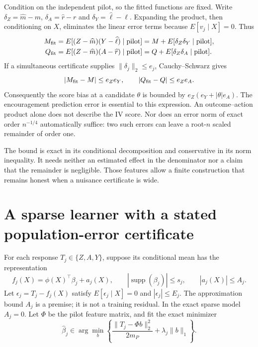 Condition on the independent pilot, so the fitted functions are fixed. Write
$\delta_Z=\widehat m-m$, $\delta_A=\widehat r-r$ and
$\delta_Y=\widehat\ell-\ell$. Expanding the product, then conditioning on $X$,
eliminates the linear error terms because $E[v_j\mid X]=0$. Thus
\begin{align}
 M_{\rm fit}&=E[(Z-\widehat m)(Y-\widehat\ell)\mid\text{pilot}]
             =M+E[\delta_Z\delta_Y\mid\text{pilot}],\\
 Q_{\rm fit}&=E[(Z-\widehat m)(A-\widehat r)\mid\text{pilot}]
             =Q+E[\delta_Z\delta_A\mid\text{pilot}].
 \label{exec13:pilot-bias}
\end{align}
If a simultaneous certificate supplies $\|\delta_j\|_2\le e_j$, Cauchy--Schwarz
gives
\begin{equation}
 |M_{\rm fit}-M|\le e_Ze_Y,\qquad
 |Q_{\rm fit}-Q|\le e_Ze_A.
 \label{exec13:pilot-products}
\end{equation}
Consequently the score bias at a candidate $\theta$ is bounded by
$e_Z(e_Y+|\theta|e_A)$. The encouragement prediction error is essential to
this expression. An outcome--action product alone does not describe the IV
score. Nor does an error norm of exact order $n^{-1/4}$ automatically suffice:
two such errors can leave a root-$n$ scaled remainder of order one.

The bound is exact in its conditional decomposition and conservative in its
norm inequality. It needs neither an estimated effect in the denominator nor
a claim that the remainder is negligible. Those features allow a finite
construction that remains honest when a nuisance certificate is wide.

\section{A sparse learner with a stated population-error certificate}

For each response $T_j\in\{Z,A,Y\}$, suppose its conditional mean has the
representation
\begin{equation}
 f_j(X)=\phi(X)^\top\beta_j+a_j(X),\qquad
 |\operatorname{supp}(\beta_j)|\le s_j,\qquad |a_j(X)|\le A_j.
\end{equation}
Let $\epsilon_j=T_j-f_j(X)$ satisfy
$E[\epsilon_j\mid X]=0$ and $|\epsilon_j|\le E_j$. The approximation bound
$A_j$ is a premise; it is not a training residual. In the exact sparse model
$A_j=0$. Let $\Phi$ be the pilot feature matrix, and fit the exact minimizer
\begin{equation}
 \widehat\beta_j\in\arg\min_b
 \left\{\frac{\|T_j-\Phi b\|_2^2}{2m_P}+\lambda_j\|b\|_1\right\}.
 \label{exec13:pilot-lasso}
\end{equation}


